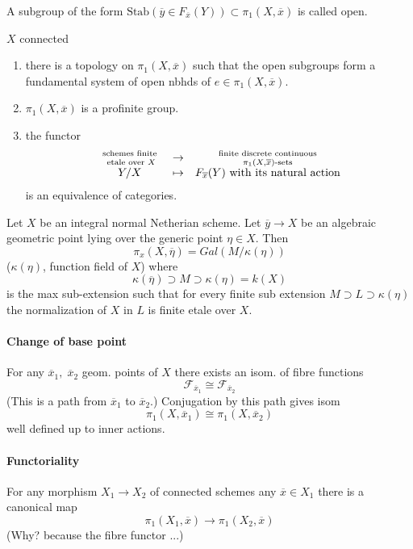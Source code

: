 \begin{definition}A subgroup of the form $\text{Stab}(\overline y\in 
F_{\overline x}(Y))\subset \pi_1(X, \overline x)$ is called open.
\end{definition}

\begin{theorem} $X$ connected
\begin{enumerate}
\item there is a topology on $\pi_1(X, \overline x)$ such that the open 
subgroups form a fundamental system of open nbhds of $e\in \pi_1(X, \overline 
x)$.
\item $\pi_1(X, \overline x)$ is a profinite group.
\item the functor 
$$
\begin{matrix}
\text{ schemes finite }\atop \text{ etale over }X & \to & 
\text{ finite discrete continuous }\atop \pi_1(X, \overline x)\text{-sets}\\
Y /  X& \mapsto & F_{\overline x}(Y) \text{ with its natural action}
\end{matrix}
$$
is an equivalence of categories. 
\end{enumerate}
\end{theorem}

\begin{proposition} Let $X$ be an integral normal Netherian scheme. Let 
$\overline y\to X$ be an algebraic geometric point lying over the generic point 
$\eta\in X$. Then
	$$\pi_x(X, \overline \eta) = Gal(M/\kappa(\eta))$$
	($\kappa(\eta)$, function field of $X$) where
	$$\kappa(\overline \eta)\supset M\supset \kappa(\eta) = k(X)$$
	is the max sub-extension such that for every finite sub extension 
$M\supset L\supset \kappa(\eta)$ the normalization of $X$ in $L$ is finite 
etale over $X$. 
\end{proposition}

\paragraph{Change of base point} For any $\overline x_1, \; \overline x_2$  
geom. points of $X$ there exists an isom. of fibre functions
	$$\mathcal{F}_{\overline x_1} \cong \mathcal{F}_{\overline x_2}$$
	(This is a path from $\overline x_1$ to $\overline x_2$.) Conjugation 
by this path gives isom
		$$\pi_1(X, \overline x_1) \cong \pi_1(X, \overline x_2)$$
		well defined up to inner actions. 

\paragraph{Functoriality} For any morphism $X_1\to X_2$ of connected schemes 
any $\overline x\in X_1$ there is a canonical map
	$$\pi_1(X_1, \overline x) \to \pi_1(X_2, \overline x)$$
(Why? because the fibre functor ...)

